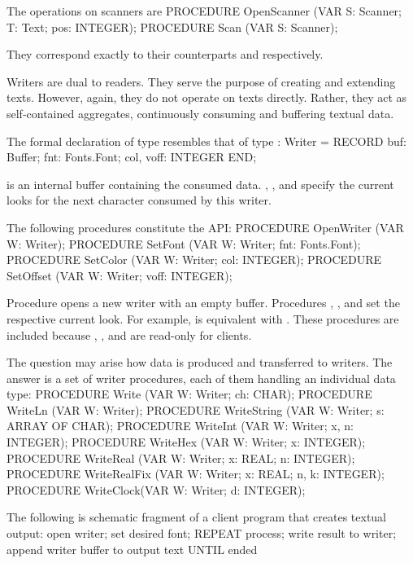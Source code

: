 The operations on scanners are
\begintt
PROCEDURE OpenScanner (VAR S: Scanner; T: Text; pos: INTEGER);
PROCEDURE Scan (VAR S: Scanner);
\endtt

\noindent They correspond exactly to their counterparts  and  respectively.

Writers are dual to readers. They serve the purpose of creating and
extending texts. However, again, they do not operate on texts
directly. Rather, they act as self-contained aggregates, continuously
consuming and buffering textual data.

The formal declaration of type  resembles that of type :
\begintt
Writer = RECORD buf:
  Buffer;
  fnt: Fonts.Font;
  col, voff: INTEGER
END;
\endtt

\noindent {} is an internal buffer containing the consumed data. , , and  specify the current looks for the next character consumed by this writer.

The following procedures constitute the  API:
\begintt
PROCEDURE OpenWriter (VAR W: Writer);
PROCEDURE SetFont (VAR W: Writer; fnt: Fonts.Font);
PROCEDURE SetColor (VAR W: Writer; col: INTEGER);
PROCEDURE SetOffset (VAR W: Writer; voff: INTEGER);
\endtt

\noindent Procedure  opens a new writer with an empty buffer. Procedures , , and  set the respective current look. For example,
 is equivalent with .
These procedures are included because , , and  are read-only for clients.

The question may arise how data is produced and transferred to
writers. The answer is a set of writer procedures, each of them
handling an individual data type:
\begintt
PROCEDURE Write (VAR W: Writer; ch: CHAR);
PROCEDURE WriteLn (VAR W: Writer);
PROCEDURE WriteString (VAR W: Writer; s: ARRAY OF CHAR);
PROCEDURE WriteInt (VAR W: Writer; x, n: INTEGER);
PROCEDURE WriteHex (VAR W: Writer; x: INTEGER);
PROCEDURE WriteReal (VAR W: Writer; x: REAL; n: INTEGER);
PROCEDURE WriteRealFix (VAR W: Writer; x: REAL; n, k: INTEGER);
PROCEDURE WriteClock(VAR W: Writer; d: INTEGER);
\endtt

\noindent The following is schematic fragment of a client program that creates textual output:
\begintt
open writer; set desired font;
REPEAT
  process;
  write result to writer;
  append writer buffer to output text
UNTIL ended
\endtt

